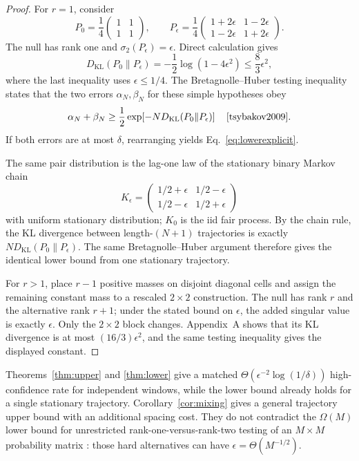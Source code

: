 \documentclass[11pt]{article}
\begin{document}
\begin{proof}
For $r=1$, consider
\[
P_0=\frac14\begin{pmatrix}1&1\\1&1\end{pmatrix},\qquad
P_\epsilon=\frac14\begin{pmatrix}1+2\epsilon&1-2\epsilon\\1-2\epsilon&1+2\epsilon\end{pmatrix}.
\]
The null has rank one and $\sigma_2(P_\epsilon)=\epsilon$. Direct calculation gives
\[
D_{\mathrm{KL}}(P_0\|P_\epsilon)
=-\frac12\log(1-4\epsilon^2)
\le \frac{8}{3}\epsilon^2,
\]
where the last inequality uses $\epsilon\le1/4$. The Bretagnolle--Huber testing inequality states that the two errors $\alpha_N,\beta_N$ for these simple hypotheses obey
\[
\alpha_N+\beta_N
\ge \frac12\exp\!\left[-N D_{\mathrm{KL}}(P_0\|P_\epsilon)\right]
\quad\text{\cite[Sec.~2.2]{tsybakov2009}}.
\]
If both errors are at most $\delta$, rearranging yields Eq.~\eqref{eq:lowerexplicit}.

The same pair distribution is the lag-one law of the stationary binary Markov chain
\[
K_\epsilon=\begin{pmatrix}1/2+\epsilon&1/2-\epsilon\\1/2-\epsilon&1/2+\epsilon\end{pmatrix}
\]
with uniform stationary distribution; $K_0$ is the iid fair process. By the chain rule, the KL divergence between length-$(N+1)$ trajectories is exactly $N D_{\mathrm{KL}}(P_0\|P_\epsilon)$. The same Bretagnolle--Huber argument therefore gives the identical lower bound from one stationary trajectory.

For $r>1$, place $r-1$ positive masses on disjoint diagonal cells and assign the remaining constant mass to a rescaled $2\times2$ construction. The null has rank $r$ and the alternative rank $r+1$; under the stated bound on $\epsilon$, the added singular value is exactly $\epsilon$. Only the $2\times2$ block changes. Appendix~A shows that its KL divergence is at most $(16/3)\epsilon^2$, and the same testing inequality gives the displayed constant.
\end{proof}

Theorems~\ref{thm:upper} and \ref{thm:lower} give a matched $\Theta(\epsilon^{-2}\log(1/\delta))$ high-confidence rate for independent windows, while the lower bound already holds for a single stationary trajectory. Corollary~\ref{cor:mixing} gives a general trajectory upper bound with an additional spacing cost. They do not contradict the $\Omega(M)$ lower bound for unrestricted rank-one-versus-rank-two testing of an $M\times M$ probability matrix \cite{huang2018structured}: those hard alternatives can have $\epsilon=\Theta(M^{-1/2})$.
\end{document}
